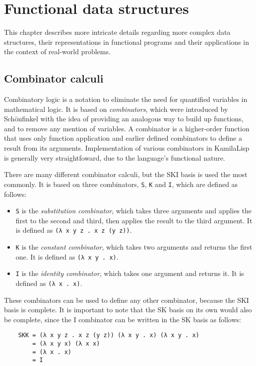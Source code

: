 
\chapter{Functional data structures}

This chapter describes more intricate details regarding more complex data structures, their representations in functional programs and their applications in the context of real-world problems.

\section{Combinator calculi}

Combinatory logic is a notation to eliminate the need for quantified variables in mathematical logic. It is based on \textit{combinators}, which were introduced by Schönfinkel with the idea of providing an analogous way to build up functions, and to remove any mention of variables. A combinator is a higher-order function that uses only function application and earlier defined combinators to define a result from its arguments. Implementation of various combinators in KamilaLisp is generally very straightfoward, due to the language's functional nature.

There are many different combinator calculi, but the SKI basis is used the most commonly. It is based on three combinators, \verb|S|, \verb|K| and \verb|I|, which are defined as follows:

\begin{itemize}
    \item \verb|S| is the \textit{substitution combinator}, which takes three arguments and applies the first to the second and third, then applies the result to the third argument. It is defined as \verb|(λ x y z . x z (y z))|.
    \item \verb|K| is the \textit{constant combinator}, which takes two arguments and returns the first one. It is defined as \verb|(λ x y . x)|.
    \item \verb|I| is the \textit{identity combinator}, which takes one argument and returns it. It is defined as \verb|(λ x . x)|.
\end{itemize}

These combinators can be used to define any other combinator, because the SKI basis is complete. It is important to note that the SK basis on its own would also be complete, since the I combinator can be written in the SK basis as follows:

\begin{Verbatim}
    SKK = (λ x y z . x z (y z)) (λ x y . x) (λ x y . x)
        = (λ x y x) (λ x x)
        = (λ x . x)
        = I
\end{Verbatim}

